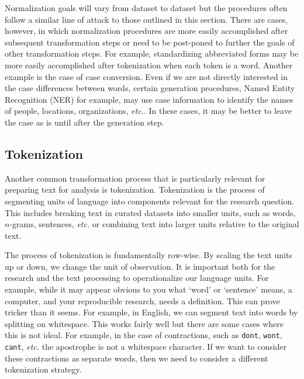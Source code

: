 \documentclass[
  letterpaper,
]{latex/krantz}
\theoremstyle{definition}
\theoremstyle{remark}
\begin{document}
Normalization goals will vary from dataset to dataset but the procedures
often follow a similar line of attack to those outlined in this section.
There are cases, however, in which normalization procedures are more
easily accomplished after subsequent transformation steps or need to be
post-poned to further the goals of other transformation steps. For
example, standardizing abbreviated forms may be more easily accomplished
after tokenization when each token is a word. Another example is the
case of case conversion. Even if we are not directly interested in the
case differences between words, certain generation procedures, Named
Entity Recognition (NER) for example, may use case information to
identify the names of people, locations, organizations, \emph{etc.}. In
these cases, it may be better to leave the case as is until after the
generation step.

\subsection{Tokenization}\label{sec-td-tokenization}

Another common transformation process that is particularly relevant for
preparing text for analysis is tokenization. Tokenization is the process
of segmenting units of language into components relevant for the
research question. This includes breaking text in curated datasets into
smaller units, such as words, \(n\)-grams, sentences, \emph{etc.} or
combining text into larger units relative to the original text.

The process of tokenization is fundamentally row-wise. By scaling the
text units up or down, we change the unit of observation. It is
important both for the research and the text processing to
operationalize our language units. For example, while it may appear
obvious to you what `word' or `sentence' means, a computer, and your
reproducible research, needs a definition. This can prove tricker than
it seems. For example, in English, we can segment text into words by
splitting on whitespace. This works fairly well but there are some cases
where this is not ideal. For example, in the case of contractions, such
as \texttt{don\textquotesingle{}t}, \texttt{won\textquotesingle{}t},
\texttt{can\textquotesingle{}t}, \emph{etc.} the apostrophe is not a
whitespace character. If we want to consider these contractions as
separate words, then we need to consider a different tokenization
strategy.
\end{document}
